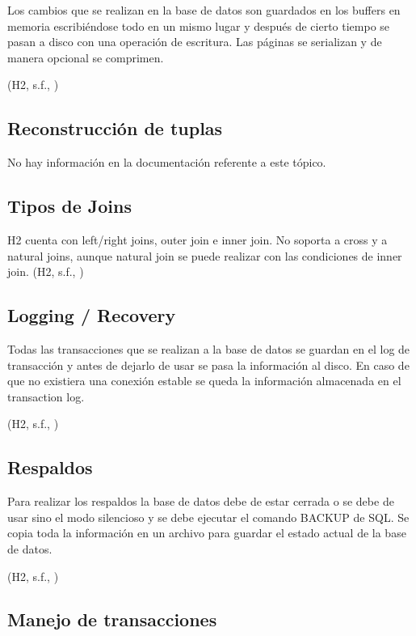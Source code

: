 \documentclass{acmart}
\begin{document}
Los cambios que se realizan en la base de datos son guardados en los buffers en memoria escribiéndose todo en un mismo lugar y después de cierto tiempo se pasan a disco con una operación de escritura. Las páginas se serializan y de manera opcional se comprimen. 

(H2, s.f., \cite{h2mvstore})

\subsection{Reconstrucción de tuplas}

No hay información en la documentación referente a este tópico.



\subsection{Tipos de Joins}

H2 cuenta con left/right joins, outer join e inner join. No soporta a cross y a natural joins, aunque natural join se puede realizar con las condiciones de inner join. 
(H2, s.f., \cite{h2grammar})

\subsection{Logging / Recovery}

Todas las transacciones que se realizan a la base de datos se guardan en el log de transacción y antes de dejarlo de usar se pasa la información al disco. En caso de que no existiera una conexión estable se queda la información almacenada en el transaction log. 

(H2, s.f., \cite{h2advanced})

\subsection{Respaldos}

Para realizar los respaldos la base de datos debe de estar cerrada o se debe de usar sino el modo silencioso y se debe ejecutar el comando BACKUP de SQL. Se copia toda la información en un archivo para guardar el estado actual de la base de datos.  

(H2, s.f., \cite{h2backup})

\subsection{Manejo de transacciones}
\end{document}
